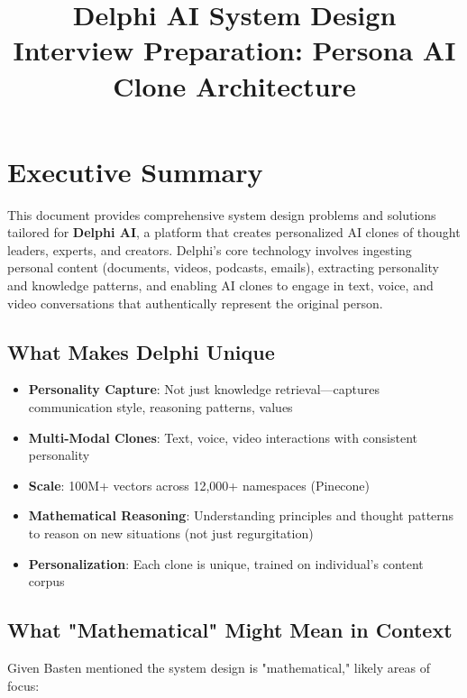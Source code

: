 \documentclass[10pt]{article}
\title{\textbf{Delphi AI System Design} \\
       \large Interview Preparation: Persona AI Clone Architecture}
\author{}
\date{}
\begin{document}
\maketitle

\tableofcontents
\newpage

\section{Executive Summary}

This document provides comprehensive system design problems and solutions tailored for \textbf{Delphi AI}, a platform that creates personalized AI clones of thought leaders, experts, and creators. Delphi's core technology involves ingesting personal content (documents, videos, podcasts, emails), extracting personality and knowledge patterns, and enabling AI clones to engage in text, voice, and video conversations that authentically represent the original person.

\subsection{What Makes Delphi Unique}

\begin{itemize}[leftmargin=*]
    \item \textbf{Personality Capture}: Not just knowledge retrieval—captures communication style, reasoning patterns, values
    \item \textbf{Multi-Modal Clones}: Text, voice, video interactions with consistent personality
    \item \textbf{Scale}: 100M+ vectors across 12,000+ namespaces (Pinecone)
    \item \textbf{Mathematical Reasoning}: Understanding principles and thought patterns to reason on new situations (not just regurgitation)
    \item \textbf{Personalization}: Each clone is unique, trained on individual's content corpus
\end{itemize}

\subsection{What "Mathematical" Might Mean in Context}

Given Basten mentioned the system design is "mathematical," likely areas of focus:
\end{document}
